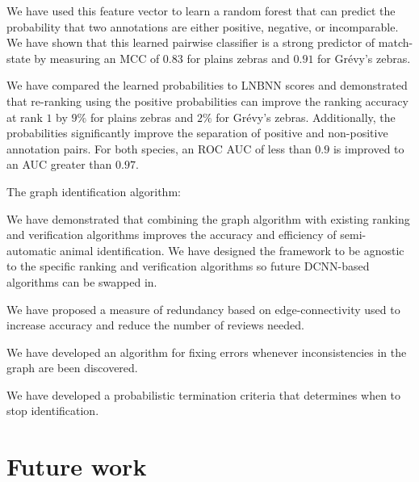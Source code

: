 \begin{enumln}
\begin{enumln}
        \item We have used this feature vector to learn a random forest that can predict the probability that two
          annotations are either positive, negative, or incomparable.
        We have shown that this learned pairwise classifier is a strong predictor of match-state by measuring an
          MCC of $0.83$ for plains zebras and $0.91$ for Grévy's zebras.

        \item We have compared the learned probabilities to LNBNN scores and demonstrated that re-ranking using
          the positive probabilities can improve the ranking accuracy at rank $1$ by $9\percent$ for plains zebras
          and $2\percent$ for Grévy's zebras.
        Additionally, the probabilities significantly improve the separation of positive and non-positive
          annotation pairs.
        For both species, an ROC AUC of less than $0.9$ is improved to an AUC greater than $0.97$.
          
        \end{enumln}

    \item {The graph identification algorithm}:
        \begin{enumln}

        \item 
            We have demonstrated that combining the graph algorithm with existing ranking and verification
              algorithms improves the accuracy and efficiency of semi-automatic animal identification.
            We have designed the framework to be agnostic to the specific ranking and verification algorithms so
              future DCNN-based algorithms can be swapped in.

        \item We have proposed a measure of redundancy based on edge-connectivity used to increase accuracy and
          reduce the number of reviews needed.

        \item We have developed an algorithm for fixing errors whenever inconsistencies in the graph are been
          discovered.

        \item We have developed a probabilistic termination criteria that determines when to stop identification.
        \end{enumln}
    \end{enumln}

    \section{Future work}\label{sec:futurework}

